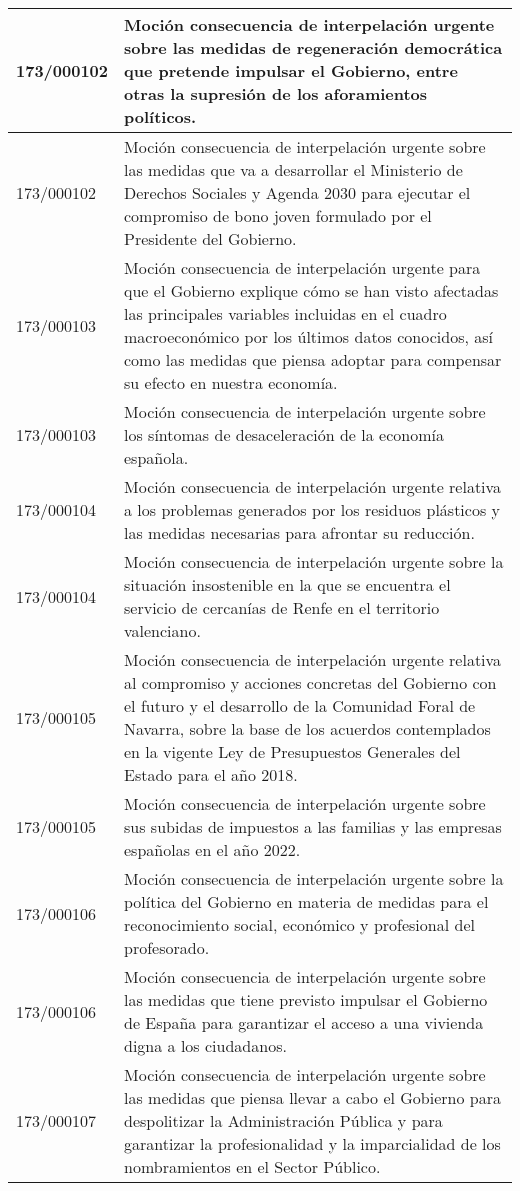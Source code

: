 {\begin{table}[H]
\begin{center}
\begin{tabularx}{\linewidth}{| l | X |}
\hline
173/000102 & Moción consecuencia de interpelación urgente sobre las medidas de regeneración democrática que pretende impulsar el Gobierno, entre otras la supresión de los aforamientos políticos. \\
\hline
173/000102 & Moción consecuencia de interpelación urgente sobre las medidas que va a desarrollar el Ministerio de Derechos Sociales y Agenda 2030 para ejecutar el compromiso de bono joven formulado por el Presidente del Gobierno. \\
\hline
173/000103 & Moción consecuencia de interpelación urgente para que el Gobierno explique cómo se han visto afectadas las principales variables incluidas en el cuadro macroeconómico por los últimos datos conocidos, así como las medidas que piensa adoptar para compensar su efecto en nuestra economía. \\
\hline
173/000103 & Moción consecuencia de interpelación urgente sobre los síntomas de desaceleración de la economía española. \\
\hline
173/000104 & Moción consecuencia de interpelación urgente relativa a los problemas generados por los residuos plásticos y las medidas necesarias para afrontar su reducción. \\
\hline
173/000104 & Moción consecuencia de interpelación urgente sobre la situación insostenible en la que se encuentra el servicio de cercanías de Renfe en el territorio valenciano. \\
\hline
173/000105 & Moción consecuencia de interpelación urgente relativa al compromiso y acciones concretas del Gobierno con el futuro y el desarrollo de la Comunidad Foral de Navarra, sobre la base de los acuerdos contemplados en la vigente Ley de Presupuestos Generales del Estado para el año 2018. \\
\hline
173/000105 & Moción consecuencia de interpelación urgente sobre sus subidas de impuestos a las familias y las empresas españolas en el año 2022. \\
\hline
173/000106 & Moción consecuencia de interpelación urgente sobre la política del Gobierno en materia de medidas para el reconocimiento social, económico y profesional del profesorado. \\
\hline
173/000106 & Moción consecuencia de interpelación urgente sobre las medidas que tiene previsto impulsar el Gobierno de España para garantizar el acceso a una vivienda digna a los ciudadanos. \\
\hline
173/000107 & Moción consecuencia de interpelación urgente sobre las medidas que piensa llevar a cabo el Gobierno para despolitizar la Administración Pública y para garantizar la profesionalidad y la imparcialidad de los nombramientos en el Sector Público. \\

\end{tabularx}
\end{center}
\end{table}}

